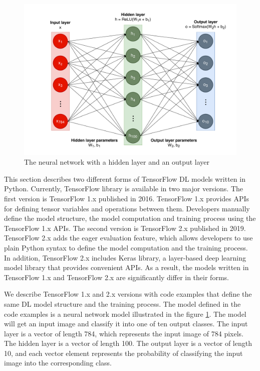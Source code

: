 \begin{figure}[ht!]
\includegraphics[width=\textwidth]{mnist_model.pdf}
  \caption{The neural network with a hidden layer and an output layer}
\label{fig:back:model}
\end{figure}

This section describes two different forms of TensorFlow DL models written in
Python.
Currently, TensorFlow library is available in two major versions.
The first version is TensorFlow 1.x published in 2016.
TensorFlow 1.x provides APIs for defining tensor variables and
operations between them.
Developers manually define the model structure, the model computation
and training process using the TensorFlow 1.x APIs.
The second version is TensorFlow 2.x published in 2019.
TensorFlow 2.x adds the eager evaluation feature,
which allows developers to use plain Python syntax to define the model
computation and the training process.
In addition, TensorFlow 2.x includes Keras library, 
a layer-based deep learning model library that provides convenient APIs.
As a result, the models written in TensorFlow 1.x and TensorFlow 2.x are
significantly differ in their forms. 

We describe TensorFlow 1.x and 2.x versions with code examples that define
the same DL model structure and the training process.
The model defined in the code examples is a neural network model illustrated
in the figure \ref{fig:back:model}.
The model will get an input image and classify it into one of ten
output classes.
The input layer is a vector of length 784, which represents the input image
of 784 pixels.
The hidden layer is a vector of length 100.
The output layer is a vector of length 10, and each vector element represents 
the probability of classifying the input image into the corresponding class.

